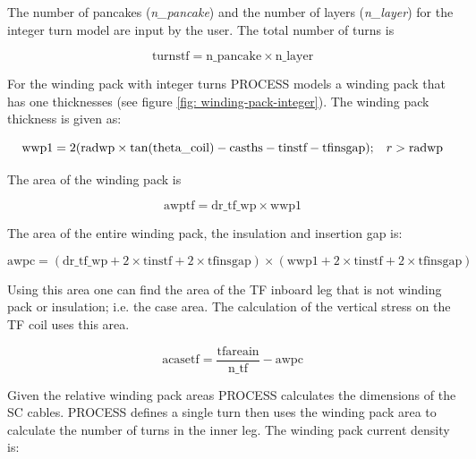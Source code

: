 \documentclass[hidelinks]{article}
\numberwithin{equation}{section}
\begin{document}
    The number of pancakes (\emph{n\_pancake}) and the number of layers (\emph{n\_layer}) 
    for the integer turn model are input by the user. The total number of turns is
    
    \begin{equation}\label{eq: turnstf-int}
        \text{turnstf} = \text{n\_pancake} \times \text{n\_layer}
    \end{equation}

    \noi For the winding pack with integer turns PROCESS models a winding pack 
    that has one thicknesses (see figure \ref{fig: winding-pack-integer}). The winding 
    pack thickness is given as:

    \begin{equation}\label{eq: wwp1-int}
    \text{wwp1} = 2(\text{radwp}\times \tan(\text{theta\_coil}) - \text{casths} - \text{tinstf} 
    - \text{tfinsgap}); \hspace{0.3cm} r > \text{radwp}
    \end{equation}

    \noi The area of the winding pack is

    \begin{equation}\label{eq: awptf-int}
    \text{awptf} = \text{dr\_tf\_wp} \times \text{wwp1}
    \end{equation}

    \noi The area of the entire winding pack, the insulation and insertion gap is:

    \begin{equation}\label{eq: awpc-int}
    \text{awpc} = (\text{dr\_tf\_wp} + 2\times \text{tinstf} + 2\times \text{tfinsgap}) 
    \times (\text{wwp1} + 2\times \text{tinstf} + 2\times \text{tfinsgap})
    \end{equation}

    \noi Using this area one can find the area of the TF inboard leg that 
    is not winding pack or insulation; i.e. the case area. The calculation of the 
    vertical stress on the TF coil uses this area.

    \begin{equation}\label{eq: acasetf-int}
    \text{acasetf} = \frac{\text{tfareain}}{\text{n\_tf}} - \text{awpc}
    \end{equation}

    \noi Given the relative winding pack areas PROCESS calculates the dimensions of 
    the SC cables. PROCESS defines a single turn then uses the winding pack area to 
    calculate the number of turns in the inner leg. The winding pack current density is:
\end{document}
